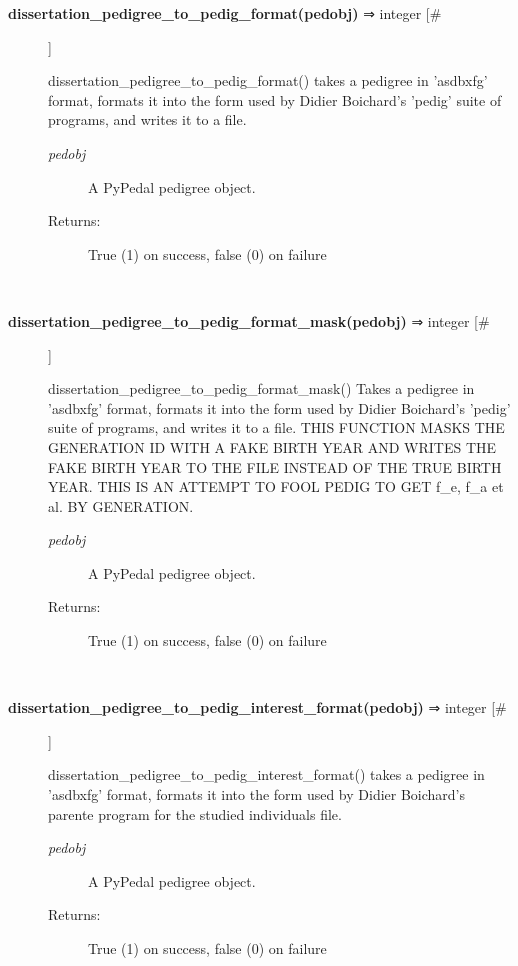 \documentclass{article}
\begin{document}
\begin{description}
\item[\textbf{dissertation\_pedigree\_to\_pedig\_format(pedobj)} ⇒ integer [\#]
]
\par dissertation\_pedigree\_to\_pedig\_format() takes a pedigree in 'asdbxfg' format, formats it into
the form used by Didier Boichard's 'pedig' suite of programs, and writes it to a file.
\begin{description}
\item[\textit{pedobj}
]
A PyPedal pedigree object.
\item[Returns:
]
True (1) on success, false (0) on failure
\end{description}\\

\item[\textbf{dissertation\_pedigree\_to\_pedig\_format\_mask(pedobj)} ⇒ integer [\#]
]
\par dissertation\_pedigree\_to\_pedig\_format\_mask() Takes a pedigree in 'asdbxfg' format,
formats it into the form used by Didier Boichard's 'pedig' suite of programs, and
writes it to a file.  THIS FUNCTION MASKS THE GENERATION ID WITH A FAKE BIRTH YEAR
AND WRITES THE FAKE BIRTH YEAR TO THE FILE INSTEAD OF THE TRUE BIRTH YEAR.  THIS IS
AN ATTEMPT TO FOOL PEDIG TO GET f\_e, f\_a et al. BY GENERATION.
\begin{description}
\item[\textit{pedobj}
]
A PyPedal pedigree object.
\item[Returns:
]
True (1) on success, false (0) on failure
\end{description}\\

\item[\textbf{dissertation\_pedigree\_to\_pedig\_interest\_format(pedobj)} ⇒ integer [\#]
]
\par dissertation\_pedigree\_to\_pedig\_interest\_format() takes a pedigree in 'asdbxfg' format,
formats it into the form used by Didier Boichard's parente program for the studied
individuals file.
\begin{description}
\item[\textit{pedobj}
]
A PyPedal pedigree object.
\item[Returns:
]
True (1) on success, false (0) on failure
\end{description}\\


\end{description}
\end{document}
